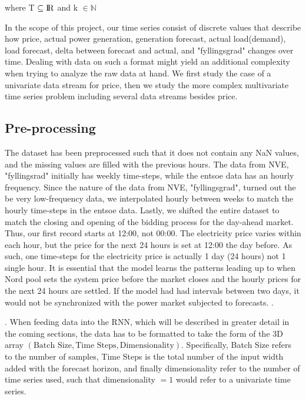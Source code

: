 \documentclass
[twocolumn,
secnumarabic,
nobibnotes,
aps,
prl,
reprint,
groupedaddress,
amsmath,
amssymb,
]{revtex4-2}
\begin{document}
where T $\subseteq {\rm I\!R}$ and k $\in \mathbb{N}$ \cite{Auffarth2021}


In the scope of this project, our time series consist of discrete values that describe how price, actual power generation, generation forecast, actual load(demand), load forecast, delta between forecast and actual, and "fyllingsgrad" changes over time. 
Dealing with data on such a format might yield an additional complexity when trying to analyze the raw data at hand. We first study the case of a univariate data stream for price, then we study the more complex multivariate time series problem including several data streams besides price. 

\subsection{Pre-processing}
The dataset has been preprocessed such that it does not contain any NaN values, and the missing values are filled with the previous hours. The data from NVE, "fyllingsrad" initially has weekly time-steps, while the entsoe data has an hourly frequency. Since the nature of the data from NVE, "fyllingsgrad", turned out the be very low-frequency data, we interpolated hourly between weeks to match the hourly time-steps in the entsoe data. Lastly, we shifted the entire dataset to match the closing and opening of the bidding process for the day-ahead market. Thus, our first record starts at 12:00, not 00:00. The electricity price varies within each hour, but the price for the next 24 hours is set at 12:00 the day before. As such, one time-steps for the electricity price is actually 1 day (24 hours) not 1 single hour. It is essential that the model learns the patterns leading up to when Nord pool sets the system price before the market closes and the hourly prices for the next 24 hours are settled. If the model had had intervals between two days, it would not be synchronized with the power market subjected to forecasts.   
.
 
 
 . When feeding data into the RNN, which will be described in greater detail in the coming sections, the data has to be formatted to take the form of the 3D array $\left(\text{Batch Size}, \text{Time Steps}, \text{Dimensionality}\right)$. Specifically, Batch Size refers to the number of samples, Time Steps is the total number of the input width added with the forecast horizon, and finally dimensionality refer to the number of time series used, such that dimensionality $= 1$ would refer to a univariate time series. 
\end{document}
